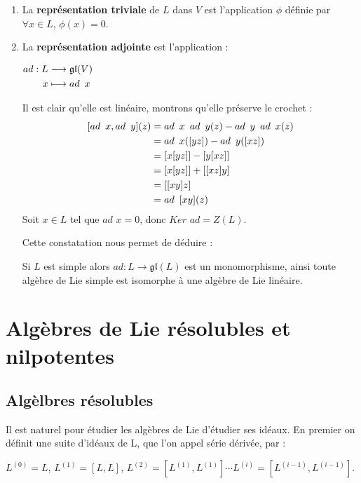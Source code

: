 \documentclass[a4paper,openany,12pt]{report}
\newcommand{\gl}{\mathfrak{gl}}
\theoremstyle{break}
{\theorembodyfont{\upshape}
\newtheorem*{rmq}{Remarque :}
\newtheorem*{prv}{Preuve :}
\newtheorem*{ex}{Exemples :}
\newtheorem*{exe}{Exemple : }
\newtheorem*{nota}{Notation :}
\newtheorem*{dem}{D\'emonstration :}}
\begin{document}
\begin{ex}
\begin{enumerate}

\item La \textbf{représentation triviale} de $L$ dans $V$ est l'application $\phi$ définie par $\forall x \in L$, $\phi(x)=0$.

\item La \textbf{représentation adjointe} est l'application :
\begin{center}
$
\begin{aligned}
ad : L & \longrightarrow \gl(V) \\
x & \longmapsto ad \enskip x 
\end{aligned}$
\end{center}
Il est clair qu'elle est linéaire, montrons qu'elle préserve le crochet :
\[
\begin{aligned}
[ad \enskip x, ad \enskip y](z) & = ad \enskip x \enskip ad \enskip y(z)- ad \enskip y \enskip ad \enskip x(z) \\
& = ad \enskip x([y z])-ad \enskip y([x z]) \\
& = [x[y z]]-[y[x z]] \\
& = [x[y z]]+[[x z] y] \\
& = [[x y] z] \\
& = ad \enskip [x y](z)
\end{aligned} \]
Soit $x \in L$ tel que $ad$ $x=0$, donc $Ker$ $ad = Z(L)$. 

Cette constatation nous permet de déduire :

\quad Si $L$ est simple alors $ad: L \longrightarrow \gl(L)$ est un monomorphisme, ainsi toute algèbre de Lie simple est isomorphe à une algèbre de Lie linéaire.
\end{enumerate}
\end{ex}

\section{Algèbres de Lie résolubles et nilpotentes}

\subsection{Algèlbres résolubles}\label{d}

\quad Il est naturel pour étudier les algèbres de Lie d'étudier ses idéaux. En premier on définit une suite d'idéaux de L, que l'on appel série dérivée, par :
\begin{center}
$L^{(0)} = L$, $L^{(1)} = [L,L]$, $L^{(2)} = [L^{(1)},L^{(1)}] \cdots L^{(i)} = [L^{(i-1)},L^{(i-1)}]$.
\end{center}
\end{document}
